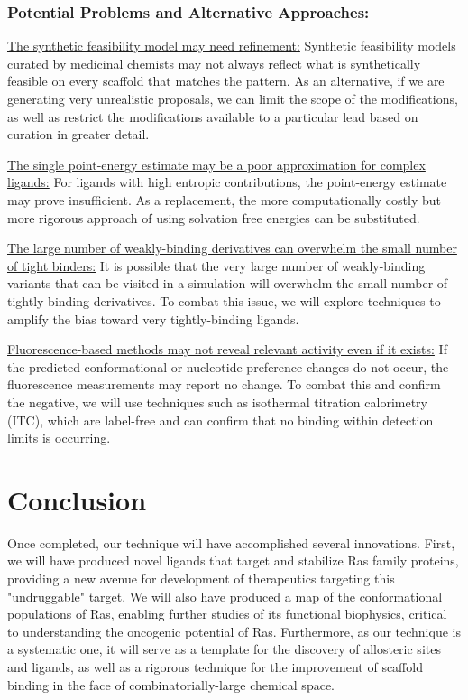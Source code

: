 \documentclass[12pt]{article}
\begin{document}
\subsubsection*{Potential Problems and Alternative Approaches:}

\underline{The synthetic feasibility model may need refinement:} Synthetic feasibility models curated by medicinal chemists may not always reflect what is synthetically feasible on every scaffold that matches the pattern. As an alternative, if we are generating very unrealistic proposals, we can limit the scope of the modifications, as well as restrict the modifications available to a particular lead based on curation in greater detail.

\underline{The single point-energy estimate may be a poor approximation for complex ligands:} For ligands with high entropic contributions, the point-energy estimate may prove insufficient. As a replacement, the more computationally costly but more rigorous approach of using solvation free energies can be substituted.

\underline{The large number of weakly-binding derivatives can overwhelm the small number of tight binders:} It is possible that the very large number of weakly-binding variants that can be visited in a simulation will overwhelm the small number of tightly-binding derivatives. To combat this issue, we will explore techniques to amplify the bias toward very tightly-binding ligands.

\underline{Fluorescence-based methods may not reveal relevant activity even if it exists:} If the predicted conformational or nucleotide-preference changes do not occur, the fluorescence measurements may report no change. To combat this and confirm the negative, we will use techniques such as isothermal titration calorimetry (ITC), which are label-free and can confirm that no binding within detection limits is occurring. 

\section*{Conclusion}
Once completed, our technique will have accomplished several innovations. First, we will have produced novel ligands that target and stabilize Ras family proteins, providing a new avenue for development of therapeutics targeting this "undruggable" target. We will also have produced a map of the conformational populations of Ras, enabling further studies of its functional biophysics, critical to understanding the oncogenic potential of Ras. Furthermore, as our technique is a systematic one, it will serve as a template for the discovery of allosteric sites and ligands, as well as a rigorous technique for the improvement of scaffold binding in the face of combinatorially-large chemical space.

\clearpage

  
  
\end{document}

